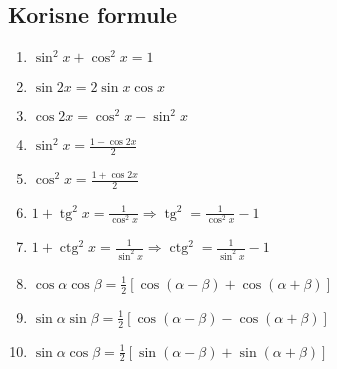 \documentclass{article}
\DeclareMathOperator{\tg}{tg}
\DeclareMathOperator{\ctg}{ctg}
\begin{document}

\vspace{2mm} 
\subsection{Korisne formule}
\begin{minipage}[t]{0.5\textwidth}
	\begin{enumerate}[label=(\arabic*)]
    \item $\sin^2 x + \cos^2 x = 1$
    \item $\sin 2x = 2 \sin x \cos x$
    \item $\cos 2x = \cos ^2 x - \sin ^2 x$
    \item $\displaystyle \sin^2 x = \frac { 1 - \cos 2x } { 2}$
    \item $\displaystyle \cos^2 x = \frac { 1 + \cos 2x } { 2}$
    \item $\displaystyle 1+ \tg ^ { 2} x = \frac { 1} { \cos ^ { 2} x } \Longrightarrow \tg^{2} = \frac { 1} { \cos ^ { 2} x } - 1$
    \item $\displaystyle 1+ \ctg ^ { 2} x = \frac { 1} { \sin ^ { 2} x } \Longrightarrow \ctg^{2} = \frac { 1} { \sin ^ { 2} x } - 1$
    \item $\displaystyle \cos \alpha \cos \beta = \frac { 1} { 2} [ \cos ( \alpha - \beta ) + \cos ( \alpha + \beta ) ]$
    \item $\displaystyle \sin \alpha \sin \beta = \frac { 1} { 2} [ \cos ( \alpha - \beta ) - \cos ( \alpha + \beta ) ] $
    \item $\displaystyle \sin \alpha \cos \beta = \frac { 1} { 2} [ \sin ( \alpha - \beta ) + \sin ( \alpha + \beta ) ] $
\end{enumerate}
\end{minipage}
\end{document}

